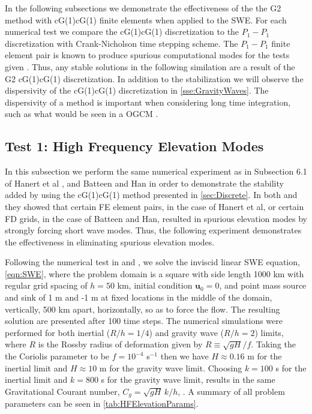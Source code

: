 In the following subsections we demonstrate the effectiveness of the the G2
method with cG(1)cG(1) finite elements when applied to the SWE. For each
numerical test we compare the cG(1)cG(1) discretization to the $P_1-P_1$
discretization with Crank-Nicholson time stepping scheme. The $P_1-P_1$ finite
element pair is known to produce spurious computational modes for the tests
given \cite{Le-Roux1998,Hanert2006}. Thus, any stable solutions in the following
similation are a result of the G2 cG(1)cG(1) discretization. In addition to the
stabilization we will observe the dispersivity of the cG(1)cG(1) discretization
in \autoref{sse:GravityWaves}. The dispersivity of a method is important when
considering long time integration, such as what would be seen in a OGCM
\cite{Le_Roux1998}.

\subsection{Test 1: High Frequency Elevation Modes} \label{sse:HFElevModes}
  In this subsection we perform the same numerical experiment as in Subsection
  6.1 of Hanert et al \cite{Hanert2002}, and Batteen and Han \cite{Batteen1981}
  in order to demonstrate the stability added by using the cG(1)cG(1) method
  presented in \autoref{sec:Discrete}. In both \cite{Hanert2002} and
  \cite{Batteen1981} they showed that certain FE element pairs, in the case of
  Hanert et al, or certain FD grids, in the case of Batteen and Han, resulted in
  spurious elevation modes by strongly forcing short wave modes. Thus, the
  following experiment demonstrates the effectiveness in eliminating spurious
  elevation modes.

  Following the numerical test in \cite{Hanert2002} and \cite{Batteen1981}, we
  solve the inviscid linear SWE equation, \eqref{eqn:SWE}, where the problem domain is
  a square with side length 1000 km with regular grid spacing of $h=50$ km,
  initial condition $\mathbf{u}_0 = 0$, and point mass source and sink of 1 m
  and -1 m at fixed locations in the middle of the domain, vertically, 500 km
  apart, horizontally, so as to force the flow.  The resulting solution are
  presented after 100 time steps. The numerical simulations were performed for
  both inertial ($R/h = 1/4$) and gravity wave ($R/h = 2$) limits, where $R$ is
  the Rossby radius of deformation given by $R \equiv \sqrt{gH}/f$. Taking the
  the Coriolis parameter to be $f = 10^{-4}$ s$^{-1}$ then we have $H \approx
  0.16$ m for the inertial limit and $H \approx 10$ m for the gravity wave
  limit. Choosing $k = 100$ s for the inertial limit and $k = 800$ s for the
  gravity wave limit, results in the same Gravitational Courant number, $C_g =
  \sqrt{gH}\,k/h$, \cite{Le-Roux1998}. A summary of all problem parameters can
  be seen in \autoref{tab:HFElevationParams}.

